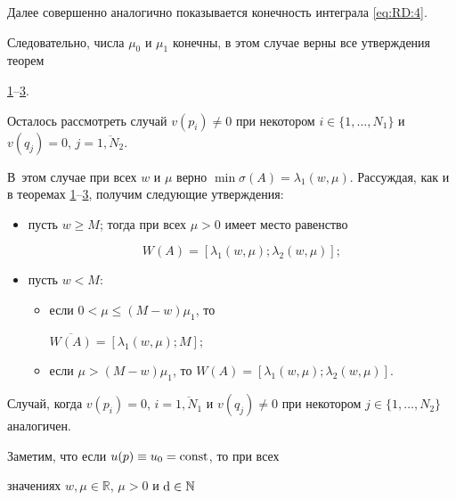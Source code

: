 Далее совершенно аналогично показывается конечность интеграла \eqref{eq:RD:4}. 

Следовательно, числа $\mu_0$ и $\mu_1$ конечны, в этом случае верны все утверждения теорем 

\hyperlink{RD:th1}{1}--\hyperlink{RD:th1}{3}.







Осталось рассмотреть случай $v(p_i) \neq 0$ при некотором $i \in \{ 1, \ldots, N_1 \}$ и $v(q_j) = 0$, $j = \overline{1,N_2}$. 

В~этом случае при всех $w$ и $\mu$ верно $\min \sigma(A)=\lambda_1(w,\mu)$. Рассуждая, как и в теоремах \hyperlink{RD:th1}{1}--\hyperlink{RD:th1}{3}, получим следующие утверждения:



\begin{itemize}

\item [1)] пусть $w \geq M$; тогда при всех $\mu>0$ имеет место равенство

$$W(A)=[\lambda_1(w, \mu); \lambda_2(w, \mu)];$$



\item [2)] пусть $w < M$:

\begin{itemize}

\item [а)] если $0 < \mu \leq (M-w) \mu_1$, то

$\overline{W(A)}=[\lambda_1(w, \mu); M];$ 

\item[б)] если $\mu > (M-w) \mu_1$, то $W(A)=[\lambda_1(w, \mu);

\lambda_2(w, \mu)]$.

\end{itemize}



\end{itemize}



Случай, когда $v(p_i) = 0$, $i = \overline{1,N_1}$ и $v(q_j) \neq

0$ при некотором $j \in \{ 1, \ldots, N_2 \}$ аналогичен.



Заметим, что если $u(p) \equiv u_0 = {\rm const}$, то при всех

значениях $w, \mu \in {\mathbb R}$, $\mu>0$ и ${\rm d} \in {\mathbb N}$

